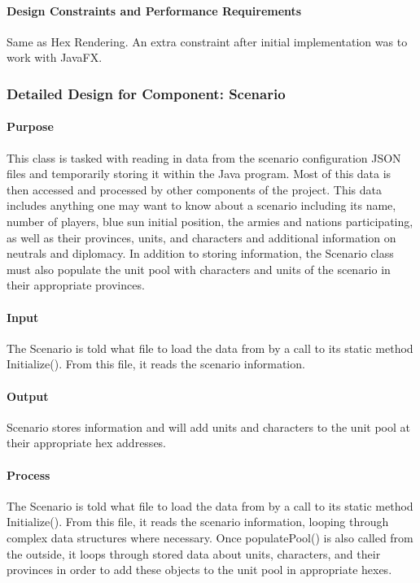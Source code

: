 \documentclass[12pt,a4paper,titlepage]{article}
\begin{document}
\paragraph{Design Constraints and Performance Requirements}
Same as Hex Rendering. An extra constraint after initial implementation was to
work with JavaFX.

\subsubsection{Detailed Design for Component: Scenario}
\paragraph{Purpose} This class is tasked with reading in data from the scenario configuration JSON files and temporarily storing it within the Java program. Most of this data is then accessed and processed by other components of the project. This data includes anything one may want to know about a scenario including its name, number of players, blue sun initial position, the armies and nations participating, as well as their provinces, units, and characters and additional information on neutrals and diplomacy. In addition to storing information, the Scenario class must also populate the unit pool with characters and units of the scenario in their appropriate provinces.
\paragraph{Input} The Scenario is told what file to load the data from by a call to its static method Initialize(). From this file, it reads the scenario information.
\paragraph{Output} Scenario stores information and will add units and characters to the unit pool at their appropriate hex addresses.
\paragraph{Process} The Scenario is told what file to load the data from by a call to its static method Initialize(). From this file, it reads the scenario information, looping through complex data structures where necessary. Once populatePool() is also called from the outside, it loops through stored data about units, characters, and their provinces in order to add these objects to the unit pool in appropriate hexes.
\end{document}
